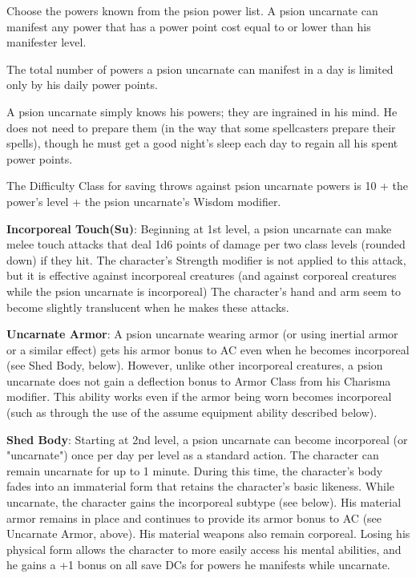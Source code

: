 Choose the powers known from the psion power list. A psion uncarnate can manifest any power that has a power point cost equal to or lower than his manifester level.

The total number of powers a psion uncarnate can manifest in a day is limited only by his daily power points.

A psion uncarnate simply knows his powers; they are ingrained in his mind. He does not need to prepare them (in the way that some spellcasters prepare their spells), though he must get a good night's sleep each day to regain all his spent power points.

The Difficulty Class for saving throws against psion uncarnate powers is 10 + the power's level + the psion uncarnate's Wisdom modifier.

\textbf{Incorporeal Touch(Su)}: Beginning at 1st level, a psion uncarnate can make melee touch attacks that deal 1d6 points of damage per two class levels (rounded down) if they hit. The character's Strength modifier is not applied to this attack, but it is effective against incorporeal creatures (and against corporeal creatures while the psion uncarnate is incorporeal) The character's hand and arm seem to become slightly translucent when he makes these attacks. 

\textbf{Uncarnate Armor}: A psion uncarnate wearing armor (or using inertial armor or a similar effect) gets his armor bonus to AC even when he becomes incorporeal (see Shed Body, below). However, unlike other incorporeal creatures, a psion uncarnate does not gain a deflection bonus to Armor Class from his Charisma modifier. This ability works even if the armor being worn becomes incorporeal (such as through the use of the assume equipment ability described below).

\textbf{Shed Body}: Starting at 2nd level, a psion uncarnate can become incorporeal (or "uncarnate") once per day per level as a standard action. The character can remain uncarnate for up to 1 minute. During this time, the character's body fades into an immaterial form that retains the character's basic likeness. While uncarnate, the character gains the incorporeal subtype (see below). His material armor remains in place and continues to provide its armor bonus to AC (see Uncarnate Armor, above). His material weapons also remain corporeal. Losing his physical form allows the character to more easily access his mental abilities, and he gains a +1 bonus on all save DCs for powers he manifests while uncarnate.

